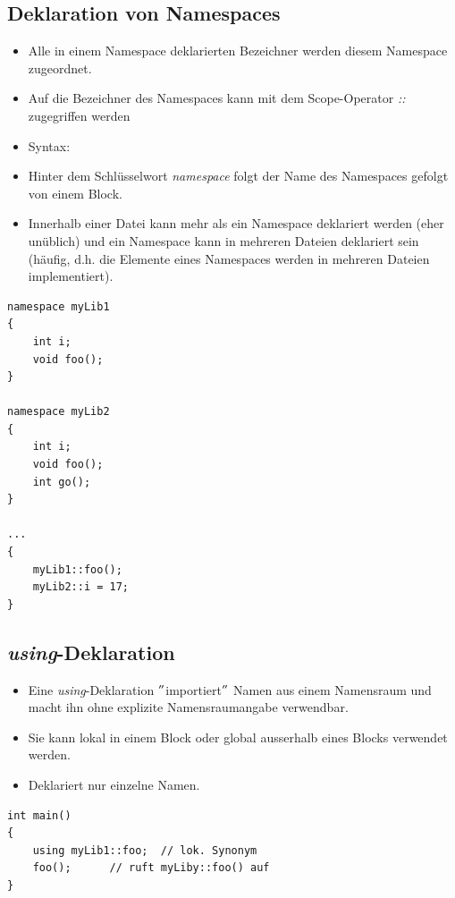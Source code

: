 \subsection{Deklaration von Namespaces}
\begin{minipage}[t]{0.7\linewidth}
	\begin{itemize}
		\item Alle in einem Namespace deklarierten Bezeichner werden diesem Namespace zugeordnet.
		\item Auf die Bezeichner des Namespaces kann mit dem Scope-Operator \emph{::} zugegriffen werden
		\item Syntax:
		\item[\-] Hinter dem Schlüsselwort \emph{namespace} folgt der Name des Namespaces gefolgt von einem Block.
		\item Innerhalb einer Datei kann mehr als ein Namespace deklariert werden (eher unüblich) und ein Namespace kann in mehreren Dateien deklariert sein (häufig, d.h. die Elemente eines Namespaces werden in mehreren Dateien implementiert).
	\end{itemize}
\end{minipage}%
\hspace{0.04\linewidth}
\begin{minipage}[t]{0.25\linewidth}
\vspace{-3\baselineskip}
\begin{lstlisting}
namespace myLib1
{
	int i;
	void foo();
}
	
namespace myLib2
{
	int i;
	void foo();
	int go();
}
	
...
{
	myLib1::foo();
	myLib2::i = 17;
}
\end{lstlisting}
\end{minipage}

\subsection{\emph{using}-Deklaration}
\vspace{-\baselineskip}
\begin{minipage}{0.5\linewidth}
\begin{itemize}
	\item Eine \emph{using}-Deklaration $"$importiert$"$ Namen aus einem Namensraum und macht ihn ohne explizite Namensraumangabe verwendbar.
	\item Sie kann lokal in einem Block oder global ausserhalb eines Blocks verwendet werden.
	\item Deklariert nur einzelne Namen.
\end{itemize}
\end{minipage}
\hspace{0.04\linewidth}
\begin{minipage}{0.45\linewidth}
\vspace{-\baselineskip}
\begin{lstlisting}
int main()
{
	using myLib1::foo;	// lok. Synonym
	foo();		// ruft myLiby::foo() auf
}
\end{lstlisting}
\end{minipage}

